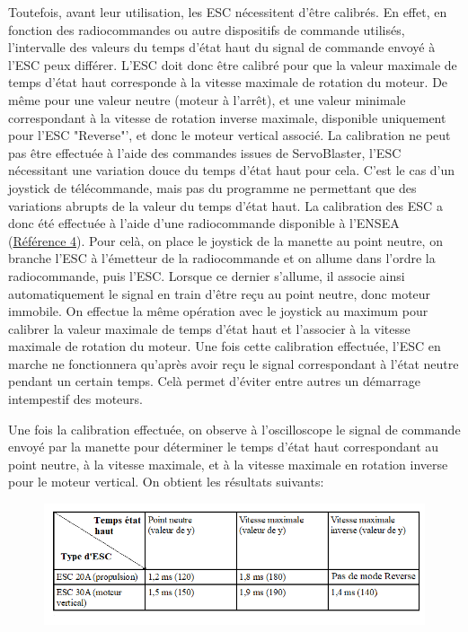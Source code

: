\documentclass[a4paper,11pt]{report}
\begin{document}
			Toutefois, avant leur utilisation, les ESC nécessitent d'être calibrés. En effet, en fonction des radiocommandes ou autre dispositifs de commande utilisés, l'intervalle des valeurs du temps d'état haut du signal de commande envoyé à l'ESC peux différer. L'ESC doit donc être calibré pour que la valeur maximale de temps d'état haut corresponde à la vitesse maximale de rotation du moteur. De même pour une valeur neutre (moteur à l'arrêt), et une valeur minimale correspondant à la vitesse de rotation inverse maximale, disponible uniquement pour l'ESC "Reverse"', et donc le moteur vertical associé. \newline
			La calibration ne peut pas être effectuée à l'aide des commandes issues de ServoBlaster, l'ESC nécessitant une variation douce du temps d'état haut pour cela. C'est le cas d'un joystick de télécommande, mais pas du programme ne permettant que des variations abrupts de la valeur du temps d'état haut. La calibration des ESC a donc été effectuée à l'aide d'une radiocommande disponible à l'ENSEA (\href{https://www.topmodel.fr/product-detail-18656-graupner-mx-20-hott-12160?lang=fr}{Référence 4}). Pour celà, on place le joystick de la manette au point neutre, on branche l'ESC à l'émetteur de la radiocommande et on allume dans l'ordre la radiocommande, puis l'ESC. Lorsque ce dernier s'allume, il associe ainsi automatiquement le signal en train d'être reçu au point neutre, donc moteur immobile. On effectue la même opération avec le joystick au maximum pour calibrer la valeur maximale de temps d'état haut et l'associer à la vitesse maximale de rotation du moteur. Une fois cette calibration effectuée, l'ESC en marche ne fonctionnera qu'après avoir reçu le signal correspondant à l'état neutre pendant un certain temps. Celà permet d'éviter entre autres un démarrage intempestif des moteurs. \newline
			
			Une fois la calibration effectuée, on observe à l'oscilloscope le signal de commande envoyé par la manette pour déterminer le temps d'état haut correspondant au point neutre, à la vitesse maximale, et à la vitesse maximale en rotation inverse pour le moteur vertical. \newpage On obtient les résultats suivants:
			
			\begin{figure}[!h]
				  \begin{center}
				  	\includegraphics[scale=0.8]{Photos/tempsesc}
				  \end{center}
		  	\end{figure}
				
\end{document}
